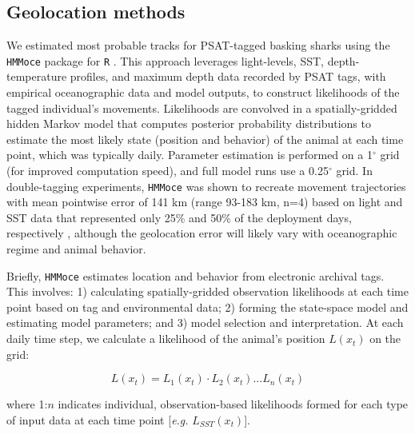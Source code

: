 \subsection{Geolocation methods}
We estimated most probable tracks for PSAT-tagged basking sharks using the \texttt{HMMoce} package \citep{Braun2018a} for \texttt{R} \citep{RDevelopmentCoreTeam2015}. This approach leverages light-levels, SST, depth-temperature profiles, and maximum depth data recorded by PSAT tags, with empirical oceanographic data and model outputs, to construct likelihoods of the tagged individual's movements. Likelihoods are convolved in a spatially-gridded hidden Markov model that computes posterior probability distributions to estimate the most likely state (position and behavior) of the animal at each time point, which was typically daily. Parameter estimation is performed on a 1$^{\circ}$ grid (for improved computation speed), and full model runs use a 0.25$^{\circ}$ grid. In double-tagging experiments, \texttt{HMMoce} was shown to recreate movement trajectories with mean pointwise error of 141 km (range 93-183 km, n=4) based on light and SST data that represented only 25\% and 50\% of the deployment days, respectively \citep{Braun2018a}, although the geolocation error will likely vary with oceanographic regime and animal behavior.

Briefly, \texttt{HMMoce} estimates location and behavior from electronic archival tags. This involves: 1) calculating spatially-gridded observation likelihoods at each time point based on tag and environmental data; 2) forming the state-space model and estimating model parameters; and 3) model selection and interpretation. At each daily time step, we calculate a likelihood of the animal's position $L(x_t)$ on the grid:

\begin{equation}
\label{eq:c3e1}
L(x_t) = L_1(x_t) \cdot L_2(x_t) ... L_n(x_t)
\end{equation}

where 1:$n$ indicates individual, observation-based likelihoods formed for each type of input data at each time point [\emph{e.g.} $L_{SST}(x_t)$].

